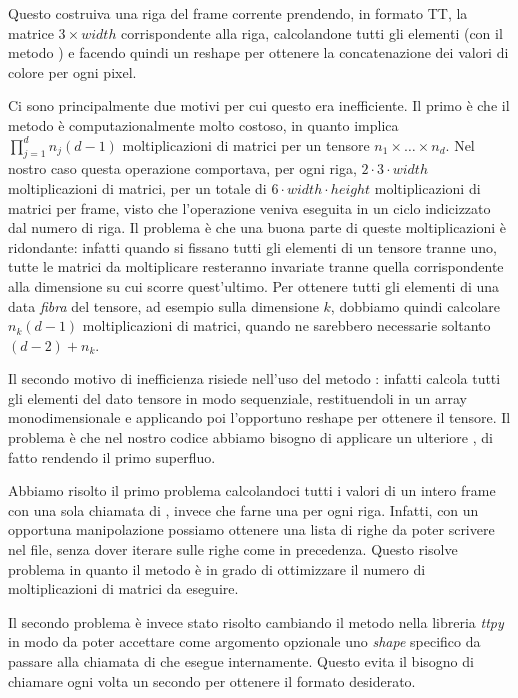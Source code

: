 \documentclass[11pt,a4paper]{article}
\begin{document}
Questo costruiva una riga del frame corrente prendendo, in formato TT, la matrice $3 \times width$ corrispondente alla riga, calcolandone tutti gli elementi (con il metodo ) e facendo quindi un reshape per ottenere la concatenazione dei valori di colore per ogni pixel.

Ci sono principalmente due motivi per cui questo era inefficiente.
Il primo è che il metodo  è computazionalmente molto costoso, in quanto implica $\prod_{j=1}^d n_j (d-1)$ moltiplicazioni di matrici per un tensore $n_1 \times \ldots \times n_d$. Nel nostro caso questa operazione comportava, per ogni riga, $2 \cdot 3 \cdot width$ moltiplicazioni di matrici, per un totale di $6 \cdot width \cdot height$ moltiplicazioni di matrici per frame, visto che l'operazione veniva eseguita in un ciclo indicizzato dal numero di riga. Il problema è che una buona parte di queste moltiplicazioni è ridondante: infatti quando si fissano tutti gli elementi di un tensore tranne uno, tutte le matrici da moltiplicare resteranno invariate tranne quella corrispondente alla dimensione su cui scorre quest'ultimo. Per ottenere tutti gli elementi di una data \emph{fibra} del tensore, ad esempio sulla dimensione $k$, dobbiamo quindi calcolare $n_k (d-1)$ moltiplicazioni di matrici, quando ne sarebbero necessarie soltanto $(d-2) + n_k$.

Il secondo motivo di inefficienza risiede nell'uso del metodo : infatti  calcola tutti gli elementi del dato tensore in modo sequenziale, restituendoli in un array monodimensionale e applicando poi l'opportuno reshape per ottenere il tensore. Il problema è che nel nostro codice abbiamo bisogno di applicare un ulteriore , di fatto rendendo il primo superfluo.

Abbiamo risolto il primo problema calcolandoci tutti i valori di un intero frame con una sola chiamata di , invece che farne una per ogni riga. Infatti, con un opportuna manipolazione possiamo ottenere una lista di righe da poter scrivere nel file, senza dover iterare sulle righe come in precedenza. Questo risolve problema in quanto il metodo  è in grado di ottimizzare il numero di moltiplicazioni di matrici da eseguire.

Il secondo problema è invece stato risolto cambiando il metodo  nella libreria \emph{ttpy} in modo da poter accettare come argomento opzionale uno \emph{shape} specifico da passare alla chiamata di  che esegue internamente. Questo evita il bisogno di chiamare ogni volta un secondo  per ottenere il formato desiderato.
\end{document}
